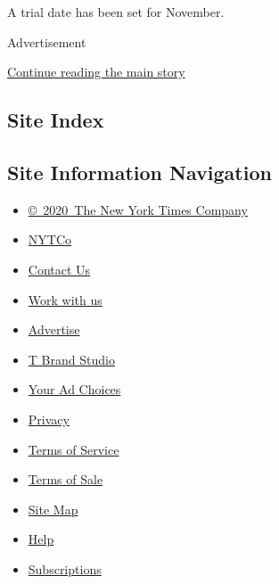 A trial date has been set for November.

Advertisement

\protect\hyperlink{after-bottom}{Continue reading the main story}

\hypertarget{site-index}{%
\subsection{Site Index}\label{site-index}}

\hypertarget{site-information-navigation}{%
\subsection{Site Information
Navigation}\label{site-information-navigation}}

\begin{itemize}
\tightlist
\item
  \href{https://help.nytimes3xbfgragh.onion/hc/en-us/articles/115014792127-Copyright-notice}{©~2020~The
  New York Times Company}
\end{itemize}

\begin{itemize}
\tightlist
\item
  \href{https://www.nytco.com/}{NYTCo}
\item
  \href{https://help.nytimes3xbfgragh.onion/hc/en-us/articles/115015385887-Contact-Us}{Contact
  Us}
\item
  \href{https://www.nytco.com/careers/}{Work with us}
\item
  \href{https://nytmediakit.com/}{Advertise}
\item
  \href{http://www.tbrandstudio.com/}{T Brand Studio}
\item
  \href{https://www.nytimes3xbfgragh.onion/privacy/cookie-policy\#how-do-i-manage-trackers}{Your
  Ad Choices}
\item
  \href{https://www.nytimes3xbfgragh.onion/privacy}{Privacy}
\item
  \href{https://help.nytimes3xbfgragh.onion/hc/en-us/articles/115014893428-Terms-of-service}{Terms
  of Service}
\item
  \href{https://help.nytimes3xbfgragh.onion/hc/en-us/articles/115014893968-Terms-of-sale}{Terms
  of Sale}
\item
  \href{https://spiderbites.nytimes3xbfgragh.onion}{Site Map}
\item
  \href{https://help.nytimes3xbfgragh.onion/hc/en-us}{Help}
\item
  \href{https://www.nytimes3xbfgragh.onion/subscription?campaignId=37WXW}{Subscriptions}
\end{itemize}
